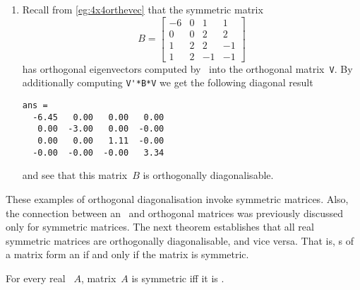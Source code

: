 \begin{example}
\begin{enumerate}
\item Recall from \autoref{eg:4x4orthevec} that the symmetric matrix
\begin{equation*}
B=\begin{bmatrix} -6 & 0 & 1 & 1
\\ 0 & 0 & 2 & 2
\\ 1 & 2 & 2 & -1
\\ 1 & 2 & -1 & -1 \end{bmatrix}
\end{equation*}
has orthogonal eigenvectors computed by \script\ into the orthogonal matrix~\verb|V|.
By additionally computing \verb|V'*B*V| we get the following diagonal result \twodp
\setbox\ajrqrbox\hbox{}%
\marginpar{\usebox{\ajrqrbox}}%
\begin{verbatim}
ans =
  -6.45   0.00   0.00   0.00
   0.00  -3.00   0.00  -0.00
   0.00   0.00   1.11  -0.00
  -0.00  -0.00  -0.00   3.34
\end{verbatim}
and see that this matrix~\(B\) is orthogonally diagonalisable.
\end{enumerate}
\end{example}



These examples of orthogonal diagonalisation invoke symmetric matrices.
Also, the connection between an \svd\ and orthogonal matrices was previously discussed only for symmetric matrices. 
The next theorem establishes that all real symmetric matrices are orthogonally diagonalisable, and vice versa.
That is, s of a matrix form an  if and only if the matrix is symmetric.
 

\begin{theorem}[spectral] \label{thm:symspec} 
For every real ~\(A\), 
matrix~\(A\) is symmetric iff it is .
\end{theorem}

